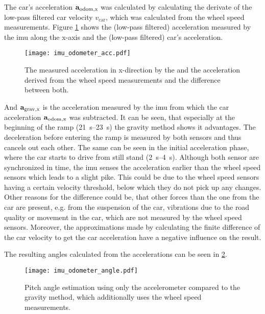 The car's acceleration $\vb{a}_\mathrm{odom,x} $ was calculated by calculating the derivate of the low-pass filtered car velocity $v_\mathrm{car} $, which was calculated from the wheel speed measurements.
Figure \ref{fig:imu_odometer_acc} shows the (low-pass filtered) acceleration measured by the \gls{imu} along the x-axis and the (low-pass filtered) car's acceleration.
\begin{figure}[htb]
    \centering
    \texttt{[image: imu\_odometer\_acc.pdf]}
    \caption[Measured acceleration from  and odometer]{The measured acceleration in x-direction by the  and the acceleration derived from the wheel speed measurements and the difference between both.}
    \label{fig:imu_odometer_acc}
\end{figure}
And $\vb{a}_\mathrm{grav,x} $ is the acceleration measured by the \gls{imu} from which the car acceleration $\vb{a}_\mathrm{odom,x} $ was subtracted.
It can be seen, that especially at the beginning of the ramp (\SIrange{21}{23}{\second}) the gravity method shows it advantages.
The deceleration before entering the ramp is measured by both sensors and thus cancels out each other.
The same can be seen in the initial acceleration phase, where the car starts to drive from still stand (\SIrange[]{2}{4}{\second}).
Although both sensor are synchronized in time, the \gls{imu} senses the acceleration earlier than the wheel speed sensors which leads to a slight pike.
This could be due to the wheel speed sensors having a certain velocity threshold, below which they do not pick up any changes.
Other reasons for the difference could be, that other forces than the one from the car are present, e.g. from the suspension of the car, vibrations due to the road quality or movement in the car, which are not measured by the wheel speed sensors.
Moreover, the approximations made by calculating the finite difference of the car velocity to get the car acceleration have a negative influence on the result.\par
The resulting angles calculated from the accelerations can be seen in \cref{fig:imu_odometer_angle}.
\begin{figure}[htb]
    \centering
    \texttt{[image: imu\_odometer\_angle.pdf]}
    \caption[Angle estimation using the gravity method]{Pitch angle estimation using only the accelerometer compared to the gravity method, which additionally uses the wheel speed measurements.}
    \label{fig:imu_odometer_angle}
\end{figure}
